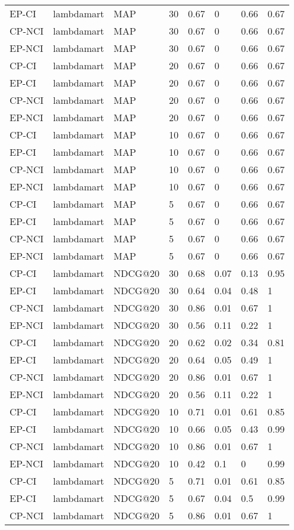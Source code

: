 \begin{landscape}
\begin{longtable}{|*{8}{l|}}
EP-CI&lambdamart&MAP&30&0.67&0&0.66&0.67\\
CP-NCI&lambdamart&MAP&30&0.67&0&0.66&0.67\\
EP-NCI&lambdamart&MAP&30&0.67&0&0.66&0.67\\
\hline
CP-CI&lambdamart&MAP&20&0.67&0&0.66&0.67\\
EP-CI&lambdamart&MAP&20&0.67&0&0.66&0.67\\
CP-NCI&lambdamart&MAP&20&0.67&0&0.66&0.67\\
EP-NCI&lambdamart&MAP&20&0.67&0&0.66&0.67\\
\hline
CP-CI&lambdamart&MAP&10&0.67&0&0.66&0.67\\
EP-CI&lambdamart&MAP&10&0.67&0&0.66&0.67\\
CP-NCI&lambdamart&MAP&10&0.67&0&0.66&0.67\\
EP-NCI&lambdamart&MAP&10&0.67&0&0.66&0.67\\
\hline
CP-CI&lambdamart&MAP&5&0.67&0&0.66&0.67\\
EP-CI&lambdamart&MAP&5&0.67&0&0.66&0.67\\
CP-NCI&lambdamart&MAP&5&0.67&0&0.66&0.67\\
EP-NCI&lambdamart&MAP&5&0.67&0&0.66&0.67\\
\hline
CP-CI&lambdamart&NDCG@20&30&0.68&0.07&0.13&0.95\\
EP-CI&lambdamart&NDCG@20&30&0.64&0.04&0.48&1\\
CP-NCI&lambdamart&NDCG@20&30&0.86&0.01&0.67&1\\
EP-NCI&lambdamart&NDCG@20&30&0.56&0.11&0.22&1\\
\hline
CP-CI&lambdamart&NDCG@20&20&0.62&0.02&0.34&0.81\\
EP-CI&lambdamart&NDCG@20&20&0.64&0.05&0.49&1\\
CP-NCI&lambdamart&NDCG@20&20&0.86&0.01&0.67&1\\
EP-NCI&lambdamart&NDCG@20&20&0.56&0.11&0.22&1\\
\hline
CP-CI&lambdamart&NDCG@20&10&0.71&0.01&0.61&0.85\\
EP-CI&lambdamart&NDCG@20&10&0.66&0.05&0.43&0.99\\
CP-NCI&lambdamart&NDCG@20&10&0.86&0.01&0.67&1\\
EP-NCI&lambdamart&NDCG@20&10&0.42&0.1&0&0.99\\
\hline
CP-CI&lambdamart&NDCG@20&5&0.71&0.01&0.61&0.85\\
EP-CI&lambdamart&NDCG@20&5&0.67&0.04&0.5&0.99\\
CP-NCI&lambdamart&NDCG@20&5&0.86&0.01&0.67&1\\

\end{longtable}
\end{landscape}
